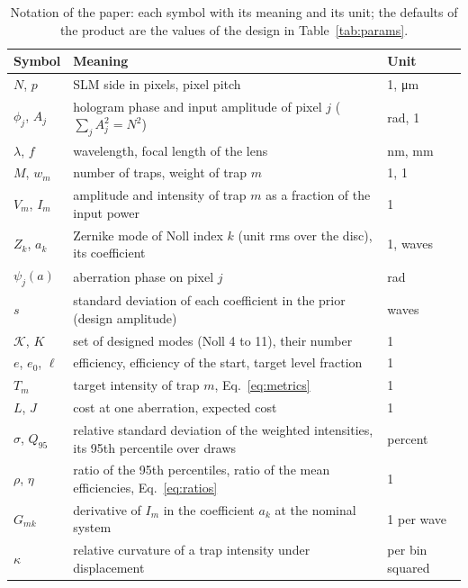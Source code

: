\begin{table}[t]
\centering\small
\caption{Notation of the paper: each symbol with its meaning and its unit; the defaults of the product are the values of the design in Table~\ref{tab:params}.}
\label{tab:notation}
\begin{tabular}{@{}p{2.2cm} p{9.4cm} p{2.6cm}@{}}
\toprule
Symbol & Meaning & Unit\\
\midrule
$N$, $p$ & SLM side in pixels, pixel pitch & 1, \si{\micro\metre}\\
$\phi_j$, $A_j$ & hologram phase and input amplitude of pixel $j$ ($\sum_jA_j^2=N^2$) & rad, 1\\
$\lambda$, $f$ & wavelength, focal length of the lens & \si{\nano\metre}, \si{\milli\metre}\\
$M$, $w_m$ & number of traps, weight of trap $m$ & 1, 1\\
$V_m$, $I_m$ & amplitude and intensity of trap $m$ as a fraction of the input power & 1\\
$Z_k$, $a_k$ & Zernike mode of Noll index $k$ (unit rms over the disc), its coefficient & 1, waves\\
$\psi_j(a)$ & aberration phase on pixel $j$ & rad\\
$s$ & standard deviation of each coefficient in the prior (design amplitude) & waves\\
$\mathcal K$, $K$ & set of designed modes (Noll 4 to 11), their number & 1\\
$e$, $e_0$, $\ell$ & efficiency, efficiency of the start, target level fraction & 1\\
$T_m$ & target intensity of trap $m$, Eq.~\eqref{eq:metrics} & 1\\
$L$, $J$ & cost at one aberration, expected cost & 1\\
$\sigma$, $Q_{95}$ & relative standard deviation of the weighted intensities, its 95th percentile over draws & percent\\
$\rho$, $\eta$ & ratio of the 95th percentiles, ratio of the mean efficiencies, Eq.~\eqref{eq:ratios} & 1\\
$G_{mk}$ & derivative of $I_m$ in the coefficient $a_k$ at the nominal system & 1 per wave\\
$\kappa$ & relative curvature of a trap intensity under displacement & per bin squared\\
\bottomrule
\end{tabular}
\end{table}
